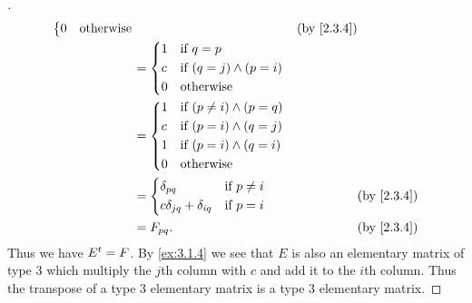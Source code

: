 \begin{proof}[]
\begin{align*}
\begin{dcases}
                                                                0 & \text{otherwise}
                                                              \end{dcases}             &  & \text{(by \cref{2.3.4})}                             \\
                                                          & = \begin{dcases}
                                                                1 & \text{if } q = p                 \\
                                                                c & \text{if } (q = j) \land (p = i) \\
                                                                0 & \text{otherwise}
                                                              \end{dcases}                                               \\
                                                          & = \begin{dcases}
                                                                1 & \text{if } (p \neq i) \land (p = q) \\
                                                                c & \text{if } (p = i) \land (q = j)    \\
                                                                1 & \text{if } (p = i) \land (q = i)    \\
                                                                0 & \text{otherwise}
                                                              \end{dcases}                                            \\
                                                          & = \begin{dcases}
                                                                \delta_{p q}                  & \text{if } p \neq i \\
                                                                c \delta_{j q} + \delta_{i q} & \text{if } p = i
                                                              \end{dcases} &  & \text{(by \cref{2.3.4})}                                \\
                                                          & = F_{p q}.                                             &  & \text{(by \cref{2.3.4})}
  \end{align*}
  Thus we have \({E}^{t} = F\).
  By \cref{ex:3.1.4} we see that \(E\) is also an elementary matrix of type 3 which multiply the \(j\)th column with \(c\) and add it to the \(i\)th column.
  Thus the transpose of a type 3 elementary matrix is a type 3 elementary matrix.
\end{proof}

\begin{ex}\label{ex:3.1.8}
\end{ex}
